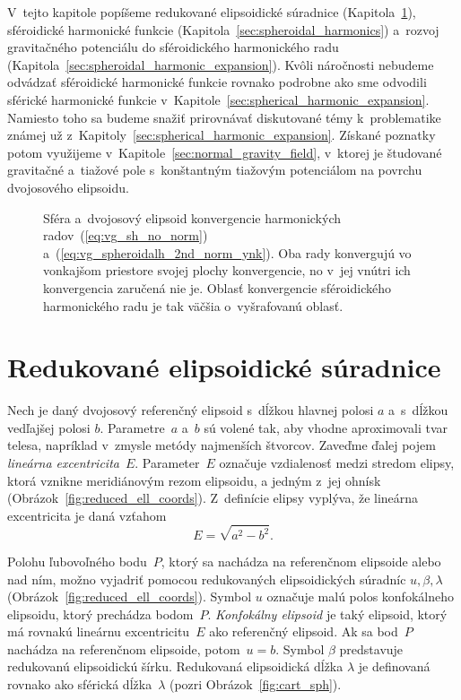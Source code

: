 \documentclass[a4paper, 12pt]{book}
\begin{document}
V~tejto kapitole popíšeme redukované elipsoidické súradnice 
(Kapitola~\ref{sec:reduced_ell_coords}), sféroidické harmonické funkcie 
(Kapitola~\ref{sec:spheroidal_harmonics}) a~rozvoj gravitačného potenciálu do 
sféroidického harmonického radu 
(Kapitola~\ref{sec:spheroidal_harmonic_expansion}).  Kvôli náročnosti nebudeme 
odvádzať sféroidické harmonické funkcie rovnako podrobne ako sme odvodili 
sférické harmonické funkcie v~Kapitole~\ref{sec:spherical_harmonic_expansion}.  
Namiesto toho sa budeme snažiť prirovnávať diskutované témy k~problematike 
známej už z~Kapitoly~\ref{sec:spherical_harmonic_expansion}.  Získané poznatky 
potom využijeme v~Kapitole~\ref{sec:normal_gravity_field}, v~ktorej je 
študované gravitačné a~tiažové pole s~konštantným tiažovým potenciálom na 
povrchu dvojosového elipsoidu.

\begin{figure}
\centering

\caption{Sféra a~dvojosový elipsoid konvergencie harmonických 
radov~(\ref{eq:vg_sh_no_norm}) a~(\ref{eq:vg_spheroidalh_2nd_norm_ynk}).  Oba 
rady konvergujú vo vonkajšom priestore svojej plochy konvergencie, no v~jej 
vnútri ich konvergencia zaručená nie je.  Oblasť konvergencie sféroidického 
harmonického radu je tak väčšia o~vyšrafovanú oblasť.}
\label{fig:spheroidal_harmonics_convergence}
\end{figure}


\section{Redukované elipsoidické súradnice}
\label{sec:reduced_ell_coords}

Nech je daný dvojosový referenčný elipsoid s~dĺžkou hlavnej polosi $a$ 
a~s~dĺžkou vedľajšej polosi $b$.  Parametre~$a$ a~$b$ sú volené tak, aby vhodne 
aproximovali tvar telesa, napríklad v~zmysle metódy najmenších štvorcov.  
Zaveďme ďalej pojem \emph{lineárna excentricita}~$E$.  Parameter~$E$ označuje 
vzdialenosť medzi stredom elipsy, ktorá vznikne meridiánovým rezom elipsoidu, 
a jedným z~jej ohnísk (Obrázok~\ref{fig:reduced_ell_coords}).  Z~definície 
elipsy vyplýva, že lineárna excentricita je daná vzťahom
%
\begin{equation}
\label{eq:linear_eccentricity}
E = \sqrt{a^2 - b^2}{.}
\end{equation}

Polohu ľubovoľného bodu~$P$, ktorý sa nachádza na referenčnom elipsoide alebo 
nad ním, možno vyjadriť pomocou redukovaných elipsoidických súradníc $u, \beta, 
\lambda$ (Obrázok~\ref{fig:reduced_ell_coords}).  Symbol $u$ označuje malú 
polos konfokálneho elipsoidu, ktorý prechádza bodom~$P$.  \emph{Konfokálny 
elipsoid} je taký elipsoid, ktorý má rovnakú lineárnu excentricitu~$E$ ako 
referenčný elipsoid.  Ak sa bod~$P$ nachádza na referenčnom elipsoide, potom~$u 
= b$.  Symbol $\beta$ predstavuje redukovanú elipsoidickú šírku.  Redukovaná 
elipsoidická dĺžka $\lambda$ je definovaná rovnako ako sférická dĺžka~$\lambda$ 
(pozri Obrázok~\ref{fig:cart_sph}).
\end{document}
